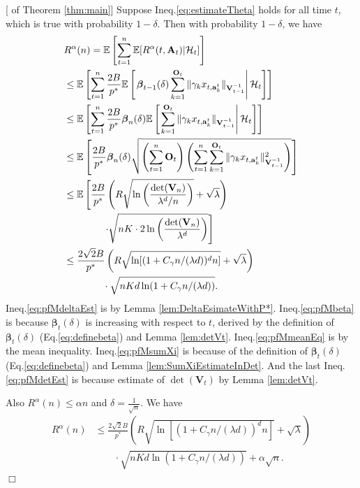 \documentclass{article}
\newcommand{\bbeta}{\boldsymbol{\beta}}
\newcommand{\EE}{\mathbb{E}}
\newcommand{\bA}{\mathbf{A}}
\newcommand{\ba}{\mathbf{a}}
\newcommand{\bO}{\mathbf{O}}
\newcommand{\bV}{\mathbf{V}}
\newcommand{\cH}{\mathcal{H}}
\newcommand{\norm}[1]{\| #1 \|}
\newenvironment{proof}{\noindent {\textbf{Proof. }}}{$\Box$ \medskip}
\begin{document}
\begin{proof}[ of Theorem \ref{thm:main}]
	Suppose Ineq.\eqref{eq:estimateTheta} holds for all time $t$, which is true with probability $1-\delta$. Then with probability $1-\delta$, we have
	\begin{align}
	&R^{\alpha}(n) = \EE \left[\sum_{t=1}^{n} \EE[R^{\alpha}(t, \bA_t) | \cH_t] \right] \notag\\
	&\leq \EE\left[\sum_{t=1}^{n} \frac{2B}{p^*} \EE \left[ \left. \bbeta_{t-1}(\delta) \sum_{k=1}^{\bO_t}\norm{\gamma_k x_{t,\ba_k^t}}_{\bV_{t-1}^{-1}}\right| \cH_t \right] \right] \label{eq:pfMdeltaEst}\\
	&\leq \EE\left[\sum_{t=1}^{n} \frac{2B}{p^*} \bbeta_{n}(\delta) \EE \left[ \left. \sum_{k=1}^{\bO_t}\norm{\gamma_k x_{t,\ba_k^t}}_{\bV_{t-1}^{-1}} \right| \cH_t \right] \right] \label{eq:pfMbeta}\\
	&\leq \EE \left[\frac{2B}{p^*} \bbeta_n(\delta) \sqrt{\left(\sum_{t=1}^{n} \bO_t\right) \left( \sum_{t=1}^{n} \sum_{k=1}^{\bO_t}\norm{\gamma_k x_{t,\ba_k^t}}_{\bV_{t-1}^{-1}}^2 \right)} \right ]  \label{eq:pfMmeanEq}\\
	&\leq \EE\left[\frac{2B}{p^*} \left( R \sqrt{ \ln \left( \frac{\det(\bV_n)}{\lambda^d / n} \right)} + \sqrt{\lambda} \right) \right. \notag\\
	& \left. \qquad \qquad \cdot \sqrt{nK \cdot 2\ln \left(\frac{\det(\bV_n)}{\lambda^d} \right)} \right] \label{eq:pfMsumXi}\\
	&\leq \frac{2\sqrt{2}B}{p^*} \left(R\sqrt{ \ln[ (1 + C_\gamma n/(\lambda d))^d n ]} + \sqrt{\lambda} \right) \notag\\
	&\qquad \qquad \cdot \sqrt{nKd\ln(1 + C_\gamma n/(\lambda d))}. \label{eq:pfMdetEst}
	\end{align}
	Ineq.\eqref{eq:pfMdeltaEst} is by Lemma \ref{lem:DeltaEsimateWithP*}. 
	Ineq.\eqref{eq:pfMbeta} is because $\bbeta_{t}(\delta)$ is increasing with respect to $t$, derived by the definition of $\bbeta_t(\delta)$ (Eq.\eqref{eq:definebeta}) and Lemma \ref{lem:detVt}. 
	Ineq.\eqref{eq:pfMmeanEq} is by the mean inequality. 
	Ineq.\eqref{eq:pfMsumXi} is because of the definition of $\bbeta_t(\delta)$ (Eq.\eqref{eq:definebeta}) and Lemma \ref{lem:SumXiEstimateInDet}. 
	And the last Ineq.\eqref{eq:pfMdetEst} is because estimate of $\det(\bV_t)$ by Lemma \ref{lem:detVt}.
	
	Also $R^{\alpha}(n) \leq \alpha n$ and $\delta = \frac{1}{\sqrt{n}}$. We have 
	\begin{align*}
		R^{\alpha}(n) &\leq \frac{2\sqrt{2}B}{p^*} \left(R\sqrt{ \ln[ (1 + C_\gamma n/(\lambda d))^d n ]} + \sqrt{\lambda} \right) \\
		&\qquad \cdot \sqrt{nKd\ln(1 + C_\gamma n/(\lambda d))} + \alpha \sqrt{n}.
	\end{align*}
\end{proof}
\end{document}
